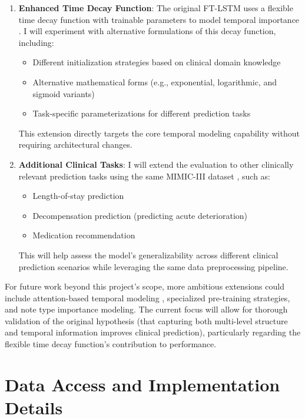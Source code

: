 \documentclass[10pt,letterpaper,twocolumn]{article}
\begin{document}
\begin{enumerate}[leftmargin=*]
    \item \textbf{Enhanced Time Decay Function}: The original FT-LSTM uses a flexible time decay function with trainable parameters to model temporal importance \cite{zhang2020time}. I will experiment with alternative formulations of this decay function, including:
    \begin{itemize}
        \item Different initialization strategies based on clinical domain knowledge
        \item Alternative mathematical forms (e.g., exponential, logarithmic, and sigmoid variants)
        \item Task-specific parameterizations for different prediction tasks
    \end{itemize}
    This extension directly targets the core temporal modeling capability without requiring architectural changes.
    
    \item \textbf{Additional Clinical Tasks}: I will extend the evaluation to other clinically relevant prediction tasks using the same MIMIC-III dataset \cite{johnson2016mimic}, such as:
    \begin{itemize}
        \item Length-of-stay prediction
        \item Decompensation prediction (predicting acute deterioration)
        \item Medication recommendation
    \end{itemize}
    This will help assess the model's generalizability across different clinical prediction scenarios while leveraging the same data preprocessing pipeline.
\end{enumerate}

For future work beyond this project's scope, more ambitious extensions could include attention-based temporal modeling \cite{vaswani2017attention}, specialized pre-training strategies, and note type importance modeling. The current focus will allow for thorough validation of the original hypothesis (that capturing both multi-level structure and temporal information improves clinical prediction), particularly regarding the flexible time decay function's contribution to performance.

\section{Data Access and Implementation Details}
\end{document}
